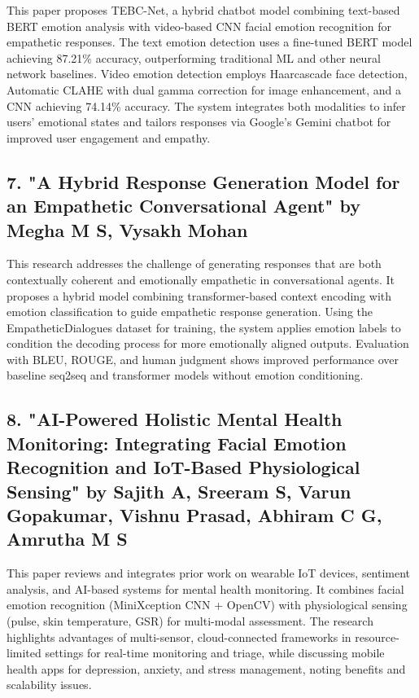 \documentclass[11pt]{report}
\begin{document}
This paper proposes TEBC-Net, a hybrid chatbot model combining text-based BERT emotion analysis with video-based CNN facial emotion recognition for empathetic responses. The text emotion detection uses a fine-tuned BERT model achieving 87.21\% accuracy, outperforming traditional ML and other neural network baselines. Video emotion detection employs Haarcascade face detection, Automatic CLAHE with dual gamma correction for image enhancement, and a CNN achieving 74.14\% accuracy. The system integrates both modalities to infer users' emotional states and tailors responses via Google's Gemini chatbot for improved user engagement and empathy.

\subsection{7. "A Hybrid Response Generation Model for an Empathetic Conversational Agent" by Megha M S, Vysakh Mohan \cite{7}}

This research addresses the challenge of generating responses that are both contextually coherent and emotionally empathetic in conversational agents. It proposes a hybrid model combining transformer-based context encoding with emotion classification to guide empathetic response generation. Using the EmpatheticDialogues dataset for training, the system applies emotion labels to condition the decoding process for more emotionally aligned outputs. Evaluation with BLEU, ROUGE, and human judgment shows improved performance over baseline seq2seq and transformer models without emotion conditioning.

\subsection{8. "AI-Powered Holistic Mental Health Monitoring: Integrating Facial Emotion Recognition and IoT-Based Physiological Sensing" by Sajith A, Sreeram S, Varun Gopakumar, Vishnu Prasad, Abhiram C G, Amrutha M S \cite{8}}

This paper reviews and integrates prior work on wearable IoT devices, sentiment analysis, and AI-based systems for mental health monitoring. It combines facial emotion recognition (MiniXception CNN + OpenCV) with physiological sensing (pulse, skin temperature, GSR) for multi-modal assessment. The research highlights advantages of multi-sensor, cloud-connected frameworks in resource-limited settings for real-time monitoring and triage, while discussing mobile health apps for depression, anxiety, and stress management, noting benefits and scalability issues.
\end{document}
